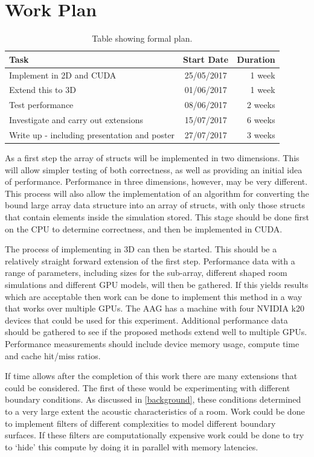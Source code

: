 \documentclass[a4paper,12pt]{article}
\begin{document}
\section{Work Plan}
\label{workplan}
\begin{table}[h]
\center
  \begin{tabular}{| l | c | r |}
    \hline
    Task & Start Date & Duration \\ \hline
    Implement in 2D and CUDA & 25/05/2017 & 1 week \\ 
    Extend this to 3D & 01/06/2017 & 1 week \\ 
    Test performance & 08/06/2017 & 2 weeks \\
    Investigate and carry out extensions & 15/07/2017 & 6 weeks \\
    Write up - including presentation and poster & 27/07/2017 & 3 weeks \\ \hline 
    
  \end{tabular}
  \caption{Table showing formal plan.}
  \label{plan}

\end{table}

As a first step the array of structs will be implemented in two dimensions. This will allow simpler testing of both correctness, as well as providing an initial idea of performance. Performance in three dimensions, however, may be very different. This process will also allow the implementation of an algorithm for converting the bound large array data structure into an array of structs, with only those structs that contain elements inside the simulation stored. This stage should be done first on the CPU to determine correctness, and then be implemented in CUDA.

The process of implementing in 3D can then be started. This should be a relatively straight forward extension of the first step. Performance data with a range of parameters, including sizes for the sub-array, different shaped room simulations and different GPU models, will then be gathered. If this yields results which are acceptable then work can be done to implement this method in a way that works over multiple GPUs. The AAG has a machine with four NVIDIA k20 devices that could be used for this experiment. Additional performance data should be gathered to see if the proposed methods extend well to multiple GPUs. Performance measurements should include device memory usage, compute time and cache hit/miss ratios.

If time allows after the completion of this work there are many extensions that could be considered. The first of these would be experimenting with different boundary conditions. As discussed in \ref{background}, these conditions determined to a very large extent the acoustic characteristics of a room. Work could be done to implement filters of different complexities to model different boundary surfaces. If these filters are computationally expensive work could be done to try to `hide' this compute by doing it in parallel with memory latencies.
\end{document}
